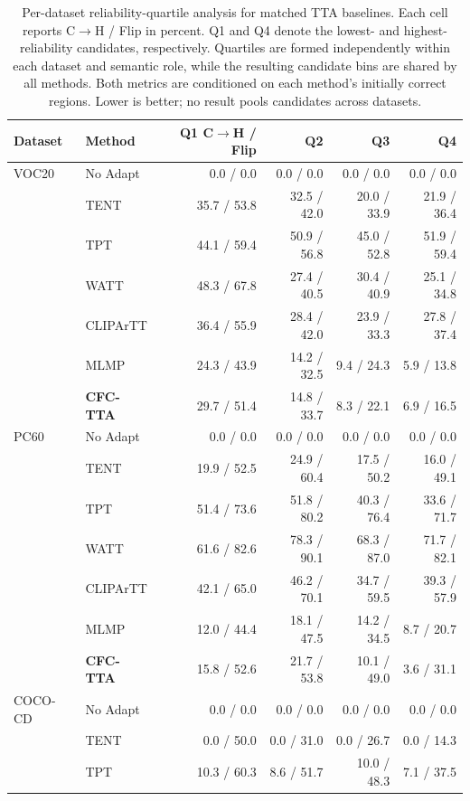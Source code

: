 \begin{table}[t]
\centering
\scriptsize
\setlength{\tabcolsep}{4pt}
\caption{Per-dataset reliability-quartile analysis for matched TTA baselines. Each cell reports C$\rightarrow$H / Flip in percent. Q1 and Q4 denote the lowest- and highest-reliability candidates, respectively. Quartiles are formed independently within each dataset and semantic role, while the resulting candidate bins are shared by all methods. Both metrics are conditioned on each method's initially correct regions. Lower is better; no result pools candidates across datasets.}
\label{tab:baseline-reliability-quartiles-per-dataset}
\begin{tabular}{llrrrr}
\toprule
Dataset & Method & Q1 C$\rightarrow$H / Flip & Q2 & Q3 & Q4 \\
\midrule
VOC20 & No Adapt & 0.0 / 0.0 & 0.0 / 0.0 & 0.0 / 0.0 & 0.0 / 0.0 \\
 & TENT & 35.7 / 53.8 & 32.5 / 42.0 & 20.0 / 33.9 & 21.9 / 36.4 \\
 & TPT & 44.1 / 59.4 & 50.9 / 56.8 & 45.0 / 52.8 & 51.9 / 59.4 \\
 & WATT & 48.3 / 67.8 & 27.4 / 40.5 & 30.4 / 40.9 & 25.1 / 34.8 \\
 & CLIPArTT & 36.4 / 55.9 & 28.4 / 42.0 & 23.9 / 33.3 & 27.8 / 37.4 \\
 & MLMP & 24.3 / 43.9 & 14.2 / 32.5 & 9.4 / 24.3 & 5.9 / 13.8 \\
 & \textbf{CFC-TTA} & 29.7 / 51.4 & 14.8 / 33.7 & 8.3 / 22.1 & 6.9 / 16.5 \\
\midrule
PC60 & No Adapt & 0.0 / 0.0 & 0.0 / 0.0 & 0.0 / 0.0 & 0.0 / 0.0 \\
 & TENT & 19.9 / 52.5 & 24.9 / 60.4 & 17.5 / 50.2 & 16.0 / 49.1 \\
 & TPT & 51.4 / 73.6 & 51.8 / 80.2 & 40.3 / 76.4 & 33.6 / 71.7 \\
 & WATT & 61.6 / 82.6 & 78.3 / 90.1 & 68.3 / 87.0 & 71.7 / 82.1 \\
 & CLIPArTT & 42.1 / 65.0 & 46.2 / 70.1 & 34.7 / 59.5 & 39.3 / 57.9 \\
 & MLMP & 12.0 / 44.4 & 18.1 / 47.5 & 14.2 / 34.5 & 8.7 / 20.7 \\
 & \textbf{CFC-TTA} & 15.8 / 52.6 & 21.7 / 53.8 & 10.1 / 49.0 & 3.6 / 31.1 \\
\midrule
COCO-CD & No Adapt & 0.0 / 0.0 & 0.0 / 0.0 & 0.0 / 0.0 & 0.0 / 0.0 \\
 & TENT & 0.0 / 50.0 & 0.0 / 31.0 & 0.0 / 26.7 & 0.0 / 14.3 \\
 & TPT & 10.3 / 60.3 & 8.6 / 51.7 & 10.0 / 48.3 & 7.1 / 37.5 \\

\end{tabular}
\end{table}
